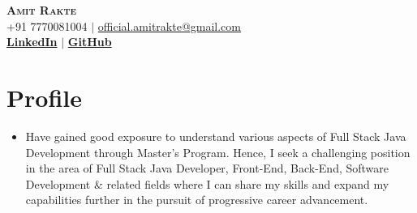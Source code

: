 \documentclass[letterpaper,11pt]{article}
\begin{document}




\begin{center}
    \textbf{\Huge \scshape Amit Rakte} \\ \vspace{1pt}
    \small +91 7770081004 $|$ \href{official.amitrakte@gmail.com}{{official.amitrakte@gmail.com}}    \\ 
    \small  
    \href{http://linkedin.com/in/amitrakte/}{\bf LinkedIn} $|$
    \href{http://github.com/Ameet-Rakte}{\bf GitHub} 
    
\end{center}



\section{Profile}
\begin{itemize}[leftmargin=0.15in, label={}]
\item 
Have gained good exposure to understand various aspects of Full Stack Java Development through Master’s Program. Hence, I seek a challenging position in the area of Full Stack Java Developer, Front-End, Back-End, Software Development & related fields where I can share my skills and expand my capabilities further in the pursuit of progressive career advancement.
\end{itemize}
\end{document}
